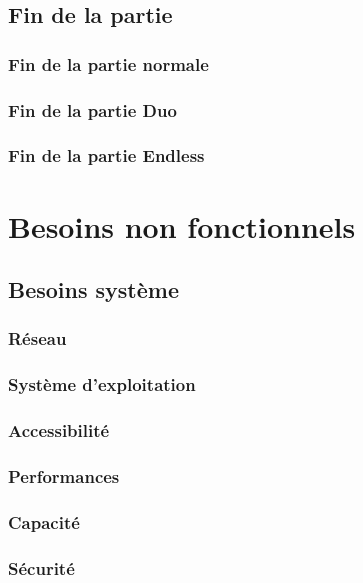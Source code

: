 \documentclass{article}
\begin{document}
\subsection{Fin de la partie}

\subsubsection{Fin de la partie normale}

\subsubsection{Fin de la partie Duo}

\subsubsection{Fin de la partie Endless}

\section{Besoins non fonctionnels}

\subsection{Besoins système}

\subsubsection{Réseau}

\subsubsection{Système d'exploitation}

\subsubsection{Accessibilité}

\subsubsection{Performances}

\subsubsection{Capacité}

\subsubsection{Sécurité}
\end{document}
